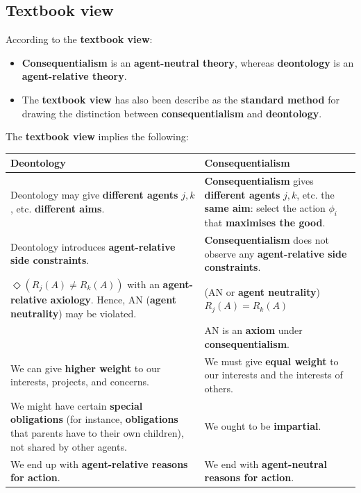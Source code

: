 \documentclass[11pt]{article}
\begin{document}
 \newpage
\subsection{Textbook view}
\label{sec:orgc8f36e7}
According to the \textbf{textbook view}:
\begin{itemize}
\item \textbf{Consequentialism} is an \textbf{agent-neutral theory}, whereas \textbf{deontology} is an \textbf{agent-relative theory}.
\item The \textbf{textbook view} has also been describe as the \textbf{standard method} for drawing the distinction between \textbf{consequentialism} and \textbf{deontology}.
\end{itemize}

The \textbf{textbook view} implies the following:
\begin{center}
\begin{tabularx}{\textwidth}{|X|X|}
\hline
Deontology & Consequentialism\\
\hline
Deontology may give \textbf{different agents} \(j, k\), etc. \textbf{different aims}. & \textbf{Consequentialism} gives \textbf{different agents} \(j, k\), etc. the \textbf{same aim}: select the action \(\phi_i\) that \textbf{maximises the good}.\\
\hline
Deontology introduces \textbf{agent-relative side constraints}. & \textbf{Consequentialism} does not observe any \textbf{agent-relative side constraints}.\\
\hline
\(\Diamond(R_j (A) \ne R_k (A))\) with an \textbf{agent-relative axiology}. Hence, AN (\textbf{agent neutrality}) may be violated. & (AN or \textbf{agent neutrality}) \(R_j (A) = R_k (A)\)\\
 & AN is an \textbf{axiom} under \textbf{consequentialism}.\\
\hline
We can give \textbf{higher weight} to our interests, projects, and concerns. & We must give \textbf{equal weight} to our interests and the interests of others.\\
\hline
We might have certain \textbf{special obligations} (for instance, \textbf{obligations} that parents have to their own children), not shared by other agents. & We ought to be \textbf{impartial}.\\
\hline
We end up with \textbf{agent-relative reasons for action}. & We end with \textbf{agent-neutral reasons for action}.\\
\hline
\end{tabularx}
\end{center}
\end{document}
